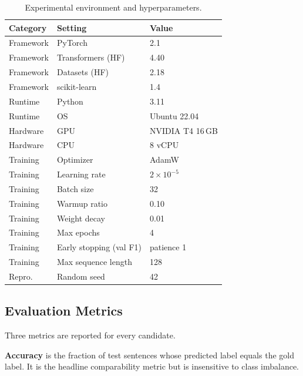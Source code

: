 \documentclass[conference]{IEEEtran}
\begin{document}
\begin{table}[t]
\caption{Experimental environment and hyperparameters.}
\label{tab:setup}
\centering
\renewcommand{\arraystretch}{1.15}
\begin{tabular}{lll}
\toprule
\textbf{Category} & \textbf{Setting} & \textbf{Value} \\
\midrule
Framework  & PyTorch              & 2.1            \\
Framework  & Transformers (HF)    & 4.40           \\
Framework  & Datasets (HF)        & 2.18           \\
Framework  & scikit-learn         & 1.4            \\
Runtime    & Python               & 3.11           \\
Runtime    & OS                   & Ubuntu 22.04   \\
Hardware   & GPU                  & NVIDIA T4 16\,GB \\
Hardware   & CPU                  & 8 vCPU         \\
Training   & Optimizer            & AdamW~\cite{loshchilov2019decoupled} \\
Training   & Learning rate        & $2 \times 10^{-5}$ \\
Training   & Batch size           & 32             \\
Training   & Warmup ratio         & 0.10           \\
Training   & Weight decay         & 0.01           \\
Training   & Max epochs           & 4              \\
Training   & Early stopping (val F1) & patience 1  \\
Training   & Max sequence length  & 128            \\
Repro.     & Random seed          & 42             \\
\bottomrule
\end{tabular}
\end{table}

\subsection{Evaluation Metrics}
\label{sec:metrics}

Three metrics are reported for every candidate.

\smallskip
\noindent\textbf{Accuracy} is the fraction of test sentences whose predicted
label equals the gold label. It is the headline comparability metric but is
insensitive to class imbalance.
\end{document}
